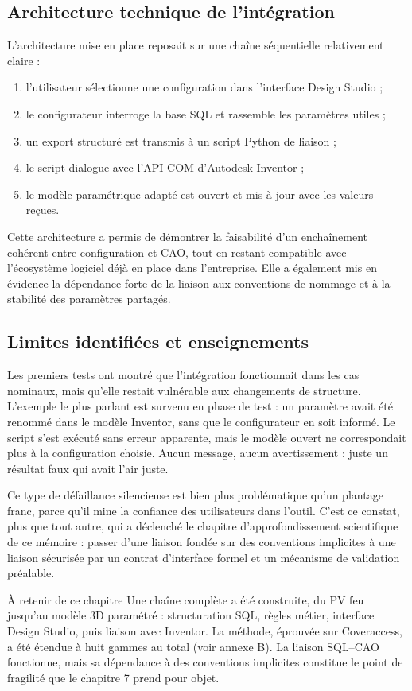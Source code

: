 \subsection{Architecture technique de l'intégration}

L'architecture mise en place reposait sur une chaîne séquentielle relativement claire :

\begin{enumerate}[leftmargin=1.4cm]
\item l'utilisateur sélectionne une configuration dans l'interface Design Studio ;
\item le configurateur interroge la base SQL et rassemble les paramètres utiles ;
\item un export structuré est transmis à un script Python de liaison ;
\item le script dialogue avec l'API COM d'Autodesk Inventor ;
\item le modèle paramétrique adapté est ouvert et mis à jour avec les valeurs reçues.
\end{enumerate}

Cette architecture a permis de démontrer la faisabilité d'un enchaînement cohérent entre configuration et CAO, tout en restant compatible avec l'écosystème logiciel déjà en place dans l'entreprise. Elle a également mis en évidence la dépendance forte de la liaison aux conventions de nommage et à la stabilité des paramètres partagés.

\subsection{Limites identifiées et enseignements}

Les premiers tests ont montré que l'intégration fonctionnait dans les cas nominaux, mais qu'elle restait vulnérable aux changements de structure. L'exemple le plus parlant est survenu en phase de test : un paramètre avait été renommé dans le modèle Inventor, sans que le configurateur en soit informé. Le script s'est exécuté sans erreur apparente, mais le modèle ouvert ne correspondait plus à la configuration choisie. Aucun message, aucun avertissement : juste un résultat faux qui avait l'air juste.

Ce type de défaillance silencieuse est bien plus problématique qu'un plantage franc, parce qu'il mine la confiance des utilisateurs dans l'outil. C'est ce constat, plus que tout autre, qui a déclenché le chapitre d'approfondissement scientifique de ce mémoire : passer d'une liaison fondée sur des conventions implicites à une liaison sécurisée par un contrat d'interface formel et un mécanisme de validation préalable.

\begin{encadretitre}{À retenir de ce chapitre}
Une chaîne complète a été construite, du PV feu jusqu'au modèle 3D paramétré : structuration SQL, règles métier, interface Design Studio, puis liaison avec Inventor. La méthode, éprouvée sur Coveraccess, a été étendue à huit gammes au total (voir annexe B). La liaison SQL--CAO fonctionne, mais sa dépendance à des conventions implicites constitue le point de fragilité que le chapitre 7 prend pour objet.
\end{encadretitre}
